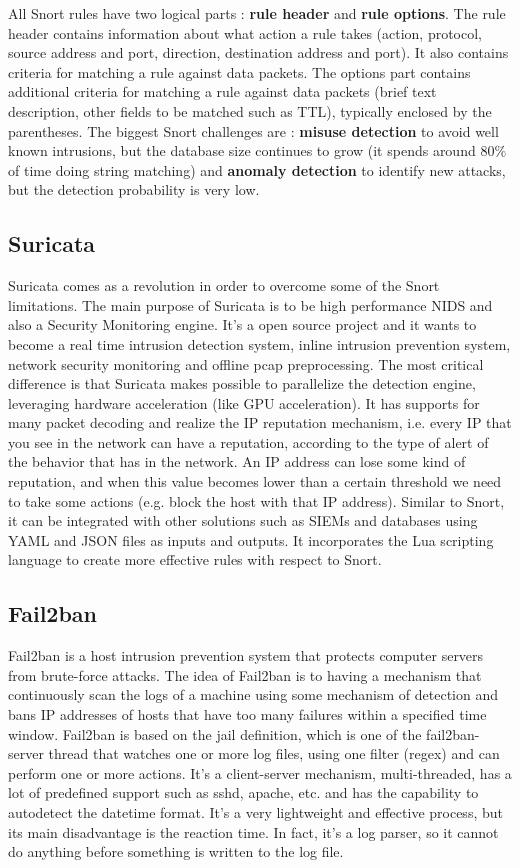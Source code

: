 \documentclass[11pt]{article}
\begin{document}
All Snort rules have two logical parts : \textbf{rule header} and \textbf{rule options}. The rule header contains information about what action a rule takes (action, protocol, source address and port, direction, destination address and port). It also contains criteria for matching a rule against data packets. The options part contains additional criteria for matching a rule against data packets (brief text description, other fields to be matched such as TTL), typically enclosed by the parentheses. The biggest Snort challenges are : \textbf{misuse detection} to avoid well known intrusions, but the database size continues to grow (it spends around $80\%$ of time doing string matching) and \textbf{anomaly detection} to identify new attacks, but the detection probability is very low.
\subsection{Suricata}
Suricata comes as a revolution in order to overcome some of the Snort limitations. The main purpose of Suricata is to be high performance NIDS and also a Security Monitoring engine. It's a open source project and it wants to become a real time intrusion detection system, inline intrusion prevention system, network security monitoring and offline pcap preprocessing. The most critical difference is that Suricata makes
possible to parallelize the detection engine, leveraging hardware acceleration (like GPU acceleration). It has supports for many packet decoding and realize the IP reputation mechanism, i.e. every IP that you see in the network can have a reputation, according to the type of alert of the behavior that has in the network. An IP address can lose some kind of reputation, and when this value becomes lower than a certain threshold we need to take some actions (e.g. block the host with that IP address). Similar to Snort, it can be integrated with other solutions such as SIEMs and databases using YAML and JSON files as inputs and outputs. It incorporates the Lua scripting language to create more effective rules with respect to Snort.
\subsection{Fail2ban}
Fail2ban is a host intrusion prevention system that protects computer servers from brute-force attacks. The idea of Fail2ban is to having a mechanism that continuously scan the logs of a machine using some mechanism of detection and bans IP addresses of hosts that have too many failures within a specified time window. Fail2ban is based on the jail definition, which is one of the fail2ban-server thread that watches one or more log files, using one filter (regex) and can perform one or more actions. It's a client-server mechanism, multi-threaded, has a lot of predefined support such as sshd, apache, etc. and has the capability to autodetect the datetime format. It's a very lightweight and effective process, but its main disadvantage is the reaction time. In fact, it's a log parser, so it cannot do anything before something is written to the log file.
\end{document}
